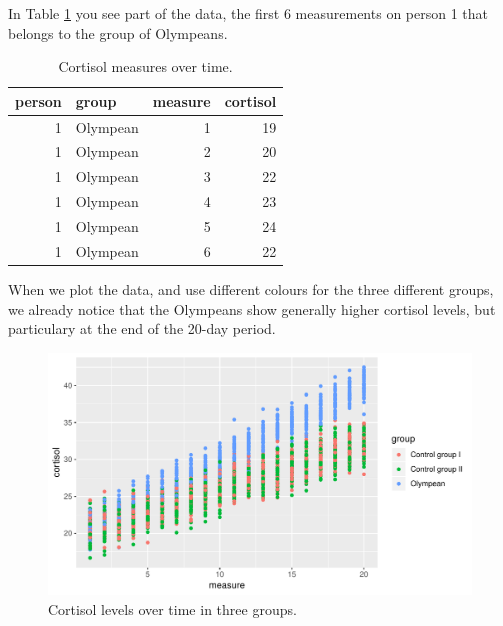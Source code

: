 \documentclass[]{book}\usepackage[]{graphicx}\usepackage[]{color}
\makeatletter
\def\maxwidth{ %
  \ifdim\Gin@nat@width>\linewidth
    \linewidth
  \else
    \Gin@nat@width
  \fi
}
\newenvironment{knitrout}{}{} %
\makeatother
\begin{document}
In Table \ref{tab:analysismixed20_1} you see part of the data, the first 6 measurements on person 1 that belongs to the group of Olympeans.

\begin{table}[ht]
\centering
\caption{Cortisol measures over time.} 
\label{tab:analysismixed20_1}
\begin{tabular}{rlrr}
  \hline
person & group & measure & cortisol \\ 
  \hline
1 & Olympean & 1 & 19 \\ 
  1 & Olympean & 2 & 20 \\ 
  1 & Olympean & 3 & 22 \\ 
  1 & Olympean & 4 & 23 \\ 
  1 & Olympean & 5 & 24 \\ 
  1 & Olympean & 6 & 22 \\ 
   \hline
\end{tabular}
\end{table}


When we plot the data, and use different colours for the three different groups, we already notice that the Olympeans show generally higher cortisol levels, but particulary at the end of the 20-day period.



\begin{knitrout}
\color{fgcolor}\begin{figure}

{\centering \includegraphics[width=\maxwidth]{figure/analysismixed20_2-1} 

}

\caption[Cortisol levels over time in three groups]{Cortisol levels over time in three groups.}\label{fig:analysismixed20_2}
\end{figure}


\end{knitrout}
\end{document}
